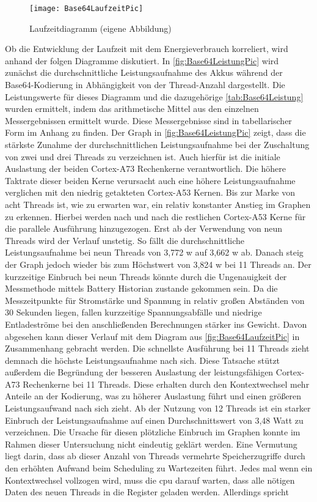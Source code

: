 \begin{figure}[H]
	\begin{center}	 
	\texttt{[image: Base64LaufzeitPic]}
	\caption{Laufzeitdiagramm (eigene Abbildung)}
	\label{fig:Base64LaufzeitPic} 
	\end{center}
\end{figure}

Ob die Entwicklung der Laufzeit mit dem Energieverbrauch korreliert, wird anhand der folgen Diagramme diskutiert. In \autoref{fig:Base64LeistungPic} wird zunächst die durchschnittliche Leistungsaufnahme des Akkus während der Base64-Kodierung in Abhängigkeit von der Thread-Anzahl dargestellt. Die Leistungswerte für dieses Diagramm  und die dazugehörige \autoref{tab:Base64Leistung} wurden ermittelt, indem das arithmetische Mittel aus den einzelnen Messergebnissen ermittelt wurde. Diese Messergebnisse sind in tabellarischer Form im Anhang zu finden. Der Graph in \autoref{fig:Base64LeistungPic} zeigt, dass die stärkste Zunahme der durchschnittlichen Leistungsaufnahme bei der Zuschaltung von zwei und drei Threads zu verzeichnen ist. Auch hierfür ist die initiale Auslastung der beiden Cortex-A73 Rechenkerne verantwortlich. Die höhere Taktrate dieser beiden Kerne verursacht auch eine höhere Leistungsaufnahme verglichen mit den niedrig getakteten Cortex-A53 Kernen. Bis zur Marke von acht Threads ist, wie zu erwarten war, ein relativ konstanter Anstieg im Graphen zu erkennen. Hierbei werden nach und nach die restlichen Cortex-A53 Kerne für die parallele Ausführung hinzugezogen. Erst ab der Verwendung von neun Threads wird der Verlauf unstetig. So fällt die durchschnittliche Leistungsaufnahme bei neun Threads von 3,772 \ac{w} auf 3,662 \ac{w} ab. Danach steig der Graph jedoch wieder bis zum Höchstwert von 3,824 \ac{w} bei 11 Threads an. Der kurzzeitige Einbruch bei neun Threads könnte durch die  Ungenauigkeit der Messmethode mittels Battery Historian zustande gekommen sein. Da die Messzeitpunkte für Stromstärke und Spannung in relativ großen Abständen von 30 Sekunden liegen, fallen kurzzeitige Spannungsabfälle und niedrige Entladeströme bei den anschließenden Berechnungen stärker ins Gewicht. Davon abgesehen kann dieser Verlauf mit dem Diagram aus \autoref{fig:Base64LaufzeitPic} in Zusammenhang gebracht werden. Die schnellste Ausführung bei 11 Threads zieht demnach die höchste Leistungsaufnahme nach sich. Diese Tatsache stützt außerdem die Begründung der besseren Auslastung der leistungsfähigen Cortex-A73 Rechenkerne bei 11 Threads. Diese erhalten durch den Kontextwechsel mehr Anteile an der Kodierung, was zu höherer Auslastung führt und einen größeren Leistungsaufwand nach sich zieht. Ab der Nutzung von 12 Threads ist ein starker Einbruch der Leistungsaufnahme auf einen Durchschnittswert von 3,48 Watt zu verzeichnen. Die Ursache für diesen plötzliche Einbruch im Graphen konnte im Rahmen dieser Untersuchung nicht eindeutig geklärt werden. Eine Vermutung liegt darin, dass ab dieser Anzahl von Threads vermehrte Speicherzugriffe durch den erhöhten Aufwand beim Scheduling zu Wartezeiten führt. Jedes mal wenn ein Kontextwechsel vollzogen wird, muss die \ac{cpu} darauf warten, dass alle nötigen Daten des neuen Threads in die Register geladen werden. Allerdings spricht 